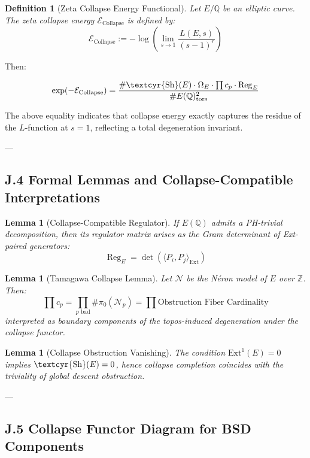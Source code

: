 \documentclass[11pt]{article}
\newtheorem{definition}[theorem]{Definition}
\newtheorem{lemma}[theorem]{Lemma}
\newcommand{\Sha}{\text{\textcyr{Sh}}}
\begin{document}
\begin{definition}[Zeta Collapse Energy Functional]
Let $E/\mathbb{Q}$ be an elliptic curve. The zeta collapse energy $\mathcal{E}_{\text{Collapse}}$ is defined by:
\[
\mathcal{E}_{\text{Collapse}} := -\log \left( \lim_{s \to 1} \frac{L(E,s)}{(s-1)^r} \right)
\]
\end{definition}

Then:

\[
\exp(-\mathcal{E}_{\text{Collapse}}) = \frac{\#\Sha(E)\cdot \Omega_E \cdot \prod c_p \cdot \operatorname{Reg}_E}{\# E(\mathbb{Q})_\text{tors}^2}
\]

The above equality indicates that collapse energy exactly captures the residue of the $L$-function at $s=1$, reflecting a total degeneration invariant.

---

\subsection*{J.4 Formal Lemmas and Collapse-Compatible Interpretations}

\begin{lemma}[Collapse-Compatible Regulator]
If $E(\mathbb{Q})$ admits a PH-trivial decomposition, then its regulator matrix arises as the Gram determinant of Ext-paired generators:
\[
\operatorname{Reg}_E = \det \left( \langle P_i, P_j \rangle_{\text{Ext}} \right)
\]
\end{lemma}

\begin{lemma}[Tamagawa Collapse Lemma]
Let $\mathcal{N}$ be the Néron model of $E$ over $\mathbb{Z}$. Then:
\[
\prod c_p = \prod_{p \text{ bad}} \#\pi_0(\mathcal{N}_p) = \prod \text{Obstruction Fiber Cardinality}
\]
interpreted as boundary components of the topos-induced degeneration under the collapse functor.
\end{lemma}

\begin{lemma}[Collapse Obstruction Vanishing]
The condition $\mathrm{Ext}^1(E) = 0$ implies $\Sha(E) = 0$, hence collapse completion coincides with the triviality of global descent obstruction.
\end{lemma}

---

\subsection*{J.5 Collapse Functor Diagram for BSD Components}
\end{document}
